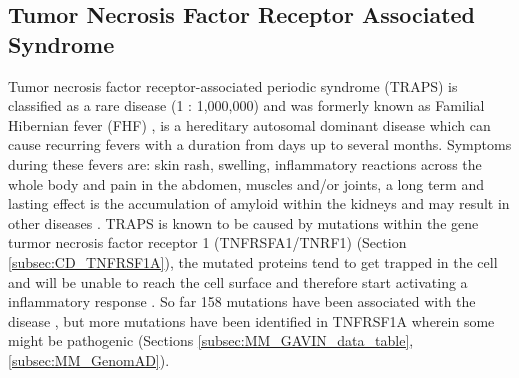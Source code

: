 \subsection{Tumor Necrosis Factor Receptor Associated Syndrome}
Tumor necrosis factor receptor-associated periodic syndrome (TRAPS) is classified as a rare disease (1 : 1,000,000) and was formerly known as Familial Hibernian fever (FHF) \cite{}, is a hereditary autosomal dominant disease which can cause recurring fevers with a duration from days up to several months. Symptoms during these fevers are: skin rash, swelling, inflammatory reactions across the whole body and pain in the abdomen, muscles and/or joints, a long term and lasting effect is the accumulation of amyloid within the kidneys and may result in other diseases \cite{}. 
TRAPS is known to be caused by mutations within the gene turmor necrosis factor receptor 1 (TNFRSFA1/TNRF1) (Section \ref{subsec:CD_TNFRSF1A}), the mutated proteins tend to get trapped in the cell and will be unable to reach the cell surface and therefore start activating a inflammatory response \cite{}.
So far 158 mutations have been associated with the disease \cite{}, but more mutations have been identified in TNFRSF1A wherein some might be pathogenic (Sections \ref{subsec:MM_GAVIN_data_table}, \ref{subsec:MM_GenomAD}).
\label{subsec:CD_TRAPS}

